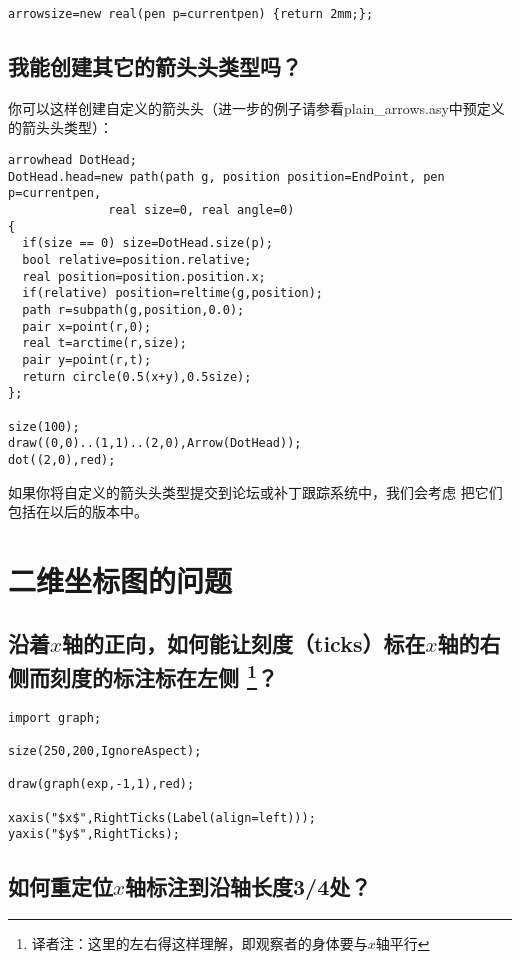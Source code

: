 \begin{lstlisting}
arrowsize=new real(pen p=currentpen) {return 2mm;};
\end{lstlisting}

\subsection{\label{Q5.4}我能创建其它的箭头头类型吗？}
你可以这样创建自定义的箭头头（进一步的例子请参看plain\_arrows.asy中预定义的箭头头类型）：

\begin{lstlisting}
arrowhead DotHead;
DotHead.head=new path(path g, position position=EndPoint, pen p=currentpen,
		      real size=0, real angle=0)
{
  if(size == 0) size=DotHead.size(p);
  bool relative=position.relative;
  real position=position.position.x;
  if(relative) position=reltime(g,position);
  path r=subpath(g,position,0.0);
  pair x=point(r,0);
  real t=arctime(r,size);
  pair y=point(r,t);
  return circle(0.5(x+y),0.5size);
};

size(100);
draw((0,0)..(1,1)..(2,0),Arrow(DotHead));
dot((2,0),red);
\end{lstlisting}
如果你将自定义的箭头头类型提交到论坛或补丁跟踪系统中，我们会考虑
把它们包括在以后的版本中。




\section{\label{Q6}二维坐标图的问题}
\subsection{\label{Q6.1}沿着$x$轴的正向，如何能让刻度（ticks）标在$x$轴的右侧而刻度的标注标在左侧
\protect\footnote{译者注：这里的左右得这样理解，即观察者的身体要与$x$轴平行}？}
\begin{lstlisting}
import graph;

size(250,200,IgnoreAspect);

draw(graph(exp,-1,1),red);

xaxis("$x$",RightTicks(Label(align=left)));
yaxis("$y$",RightTicks);
\end{lstlisting}

\subsection{\label{Q6.2}如何重定位$x$轴标注到沿轴长度3/4处？}

